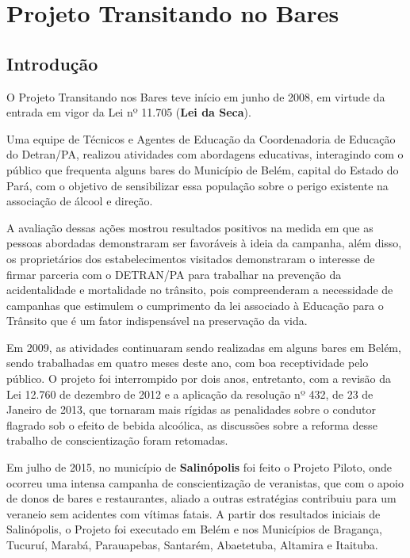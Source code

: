 \chapter{Projeto Transitando no Bares}

\section{Introdução}
O Projeto Transitando nos Bares teve início em junho de 2008, em virtude da entrada em vigor da Lei nº 11.705 (\textbf{Lei da Seca}).\vskip0.3cm

Uma equipe de Técnicos e Agentes de Educação da Coordenadoria de Educação do Detran/PA, realizou atividades com abordagens educativas, interagindo com o público que frequenta alguns bares do Município de Belém, capital do Estado do Pará, com o objetivo de sensibilizar essa população sobre o perigo existente na associação de álcool e direção. \vskip0.3cm

A avaliação dessas ações mostrou resultados positivos na medida em que as pessoas abordadas demonstraram ser favoráveis à ideia da campanha, além disso, os proprietários dos estabelecimentos visitados demonstraram o interesse de firmar parceria com o DETRAN/PA para trabalhar na prevenção da acidentalidade e mortalidade no trânsito, pois compreenderam a necessidade de campanhas que estimulem o cumprimento da lei associado à Educação para o Trânsito que é um fator indispensável na preservação da vida.\vskip0.3cm

Em 2009, as atividades continuaram sendo realizadas em alguns bares em Belém, sendo trabalhadas em quatro meses deste ano, com boa receptividade pelo público. O projeto foi interrompido por dois anos, entretanto, com a revisão da Lei 12.760 de dezembro de 2012 e a aplicação da resolução nº 432, de 23 de Janeiro de 2013, que tornaram mais rígidas as penalidades sobre o condutor flagrado sob o efeito de bebida alcoólica, as discussões sobre a reforma desse trabalho de conscientização foram retomadas.\vskip0.3cm

Em julho de 2015, no município de \textbf{Salinópolis} foi feito o Projeto Piloto, onde ocorreu uma intensa campanha de conscientização de veranistas, que com o apoio de donos de bares e restaurantes, aliado a outras estratégias contribuiu para um veraneio sem acidentes com vítimas fatais. A partir dos resultados iniciais de Salinópolis, o Projeto foi executado em Belém e nos Municípios de Bragança, Tucuruí, Marabá, Parauapebas, Santarém, Abaetetuba, Altamira e Itaituba.\vskip0.3cm


